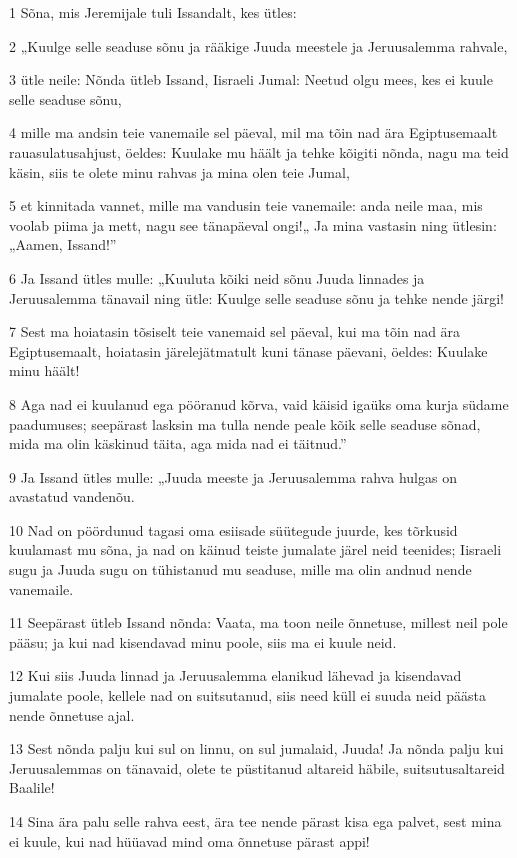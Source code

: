 \par 1 Sõna, mis Jeremijale tuli Issandalt, kes ütles:
\par 2 „Kuulge selle seaduse sõnu ja rääkige Juuda meestele ja Jeruusalemma rahvale,
\par 3 ütle neile: Nõnda ütleb Issand, Iisraeli Jumal: Neetud olgu mees, kes ei kuule selle seaduse sõnu,
\par 4 mille ma andsin teie vanemaile sel päeval, mil ma tõin nad ära Egiptusemaalt rauasulatusahjust, öeldes: Kuulake mu häält ja tehke kõigiti nõnda, nagu ma teid käsin, siis te olete minu rahvas ja mina olen teie Jumal,
\par 5 et kinnitada vannet, mille ma vandusin teie vanemaile: anda neile maa, mis voolab piima ja mett, nagu see tänapäeval ongi!„ Ja mina vastasin ning ütlesin: „Aamen, Issand!”
\par 6 Ja Issand ütles mulle: „Kuuluta kõiki neid sõnu Juuda linnades ja Jeruusalemma tänavail ning ütle: Kuulge selle seaduse sõnu ja tehke nende järgi!
\par 7 Sest ma hoiatasin tõsiselt teie vanemaid sel päeval, kui ma tõin nad ära Egiptusemaalt, hoiatasin järelejätmatult kuni tänase päevani, öeldes: Kuulake minu häält!
\par 8 Aga nad ei kuulanud ega pööranud kõrva, vaid käisid igaüks oma kurja südame paadumuses; seepärast lasksin ma tulla nende peale kõik selle seaduse sõnad, mida ma olin käskinud täita, aga mida nad ei täitnud.”
\par 9 Ja Issand ütles mulle: „Juuda meeste ja Jeruusalemma rahva hulgas on avastatud vandenõu.
\par 10 Nad on pöördunud tagasi oma esiisade süütegude juurde, kes tõrkusid kuulamast mu sõna, ja nad on käinud teiste jumalate järel neid teenides; Iisraeli sugu ja Juuda sugu on tühistanud mu seaduse, mille ma olin andnud nende vanemaile.
\par 11 Seepärast ütleb Issand nõnda: Vaata, ma toon neile õnnetuse, millest neil pole pääsu; ja kui nad kisendavad minu poole, siis ma ei kuule neid.
\par 12 Kui siis Juuda linnad ja Jeruusalemma elanikud lähevad ja kisendavad jumalate poole, kellele nad on suitsutanud, siis need küll ei suuda neid päästa nende õnnetuse ajal.
\par 13 Sest nõnda palju kui sul on linnu, on sul jumalaid, Juuda! Ja nõnda palju kui Jeruusalemmas on tänavaid, olete te püstitanud altareid häbile, suitsutusaltareid Baalile!
\par 14 Sina ära palu selle rahva eest, ära tee nende pärast kisa ega palvet, sest mina ei kuule, kui nad hüüavad mind oma õnnetuse pärast appi!
